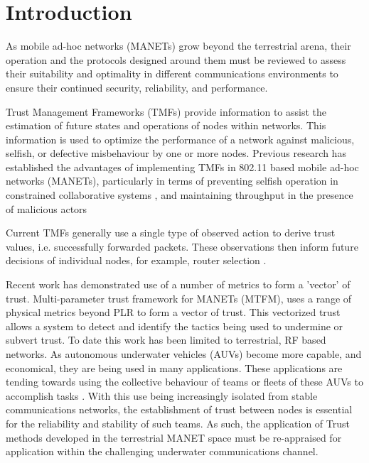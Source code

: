 \documentclass[runningheads,a4paper]{llncs}
\begin{document}
\section{Introduction}\label{sec:introduction}

As mobile ad-hoc networks (MANETs) grow beyond the terrestrial arena, their operation and the protocols designed around them must be reviewed to assess their suitability and optimality in different communications environments to ensure their continued security, reliability, and performance.

Trust Management Frameworks (TMFs) provide information to assist the estimation of future states and operations of nodes within networks.
This information is used to optimize the performance of a network against malicious, selfish, or defective misbehaviour by one or more nodes.
Previous research has established the advantages of implementing TMFs in 802.11 based mobile ad-hoc networks (MANETs), particularly in terms of preventing selfish operation in constrained collaborative systems \cite{Li2007}, and maintaining throughput in the presence of malicious actors \cite{Buchegger2002}

Current TMFs generally use a single type of observed action to derive trust values, i.e. successfully forwarded packets. These observations then inform future decisions of individual nodes, for example, router selection \cite{Li2008}.

Recent work has demonstrated use of a number of metrics to form a 'vector’ of trust.
Multi-parameter trust framework for MANETs (MTFM)\cite{Guo2012}, uses a range of physical metrics beyond PLR to form a vector of trust.
This vectorized trust allows a system to detect and identify the tactics being used to undermine or subvert trust.
To date this work has been limited to terrestrial, RF based networks.
As autonomous underwater vehicles (AUVs) become more capable, and economical, they are being used in many applications.
These applications are tending towards using the collective behaviour of teams or fleets of these AUVs to accomplish tasks \cite{Caiti2011}.
With this use being increasingly isolated from stable communications networks, the establishment of trust between nodes is essential for the reliability and stability of such teams.
As such, the application of Trust methods developed in the terrestrial MANET space must be re-appraised for application within the challenging underwater communications channel.
\end{document}
